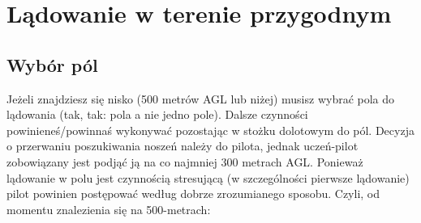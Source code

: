\documentclass{article}
\begin{document}
\section{Lądowanie w terenie przygodnym}
\subsection{Wybór pól}
Jeżeli znajdziesz się nisko (500 metrów AGL lub niżej) musisz wybrać pola
do lądowania (tak, tak: pola a nie jedno pole).
Dalsze czynności powinieneś/powinnaś
wykonywać pozostając w stożku dolotowym do pól. Decyzja o przerwaniu
poszukiwania noszeń należy do pilota, jednak uczeń-pilot zobowiązany jest
podjąć ją na co najmniej 300 metrach AGL. Ponieważ lądowanie w polu 
jest czynnością stresującą (w szczególności pierwsze lądowanie)
pilot powinien postępować według dobrze zrozumianego
sposobu. Czyli, od momentu znalezienia się na 500-metrach:
\end{document}
